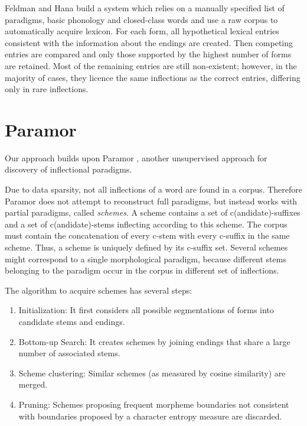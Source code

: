 \documentclass{itatnew}
\begin{document}
Feldman and Hana \cite{hana-etal-2004-emnlp,feldman-hana-2010-rodopi}
build a system which relies on a manually specified list of paradigms, basic phonology and closed-class words and use a raw corpus to automatically acquire lexicon. For each form, all hypothetical lexical entries consistent with the information about the endings are created. Then competing entries are compared and only those supported by the highest number of forms are retained. Most of the remaining entries are still non-existent; however, in the majority of cases, they licence the same inflections as the correct entries, differing only in rare inflections.


\section{Paramor}
\label{sec:paramor}

Our approach builds upon Paramor \cite{monson09}, another unsupervised approach for discovery of inflectional paradigms.

Due to data sparsity, not all inflections of a word are found in a corpus. Therefore Paramor does not attempt to reconstruct 
full paradigms, but instead works with partial paradigms, called \emph{schemes}. A scheme contains a set of c(andidate)-suffixes and a set of c(andidate)-stems inflecting according to this scheme. The corpus must contain the concatenation of every c-stem with every c-suffix in the same scheme. Thus, a scheme is uniquely defined by its c-suffix set. Several schemes might correspond to a single morphological paradigm, because different stems belonging to the paradigm occur in the corpus in different set of inflections.

The algorithm to acquire schemes has several steps:
\begin{enumerate}
\item Initialization: It first considers all possible segmentations of forms into candidate stems and endings.
\item Bottom-up Search: It creates schemes by joining endings that share a large number of associated stems.
\item Scheme clustering: Similar schemes (as measured by cosine similarity) are merged.
\item Pruning: Schemes proposing frequent morpheme boundaries not consistent with boundaries proposed by a character entropy measure are discarded.
\end{enumerate}
\end{document}
